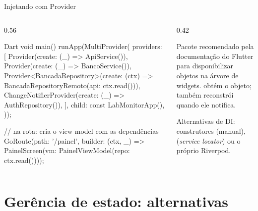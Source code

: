 \documentclass[aspectratio=169,10pt]{beamer}
\begin{document}
\begin{frame}[fragile]{Injetando com Provider}
  \begin{columns}[T]
    \begin{column}{0.56\textwidth}
\begin{codigo}[title=main.dart]{Dart}
void main() {
  runApp(MultiProvider(
    providers: [
      Provider(create: (_) => ApiService()),
      Provider(create: (_) => BancoService()),
      Provider<BancadaRepository>(create: (ctx) =>
          BancadaRepositoryRemoto(api: ctx.read())),
      ChangeNotifierProvider(create: (_) => AuthRepository()),
    ],
    child: const LabMonitorApp(),
  ));
}

// na rota: cria o view model com as dependências
GoRoute(path: '/painel', builder: (ctx, _) =>
    PainelScreen(vm: PainelViewModel(repo: ctx.read())));
\end{codigo}
    \end{column}
    \begin{column}{0.42\textwidth}
      \begin{conceito}[Provider]
        Pacote recomendado pela documentação do Flutter para disponibilizar objetos na árvore de widgets.  obtém o objeto;  também reconstrói quando ele notifica.
      \end{conceito}
      \begin{dica}
        Alternativas de DI: construtores (manual),  (\emph{service locator}) ou o próprio Riverpod.
      \end{dica}
    \end{column}
  \end{columns}
\end{frame}

\section{Gerência de estado: alternativas}
\end{document}
